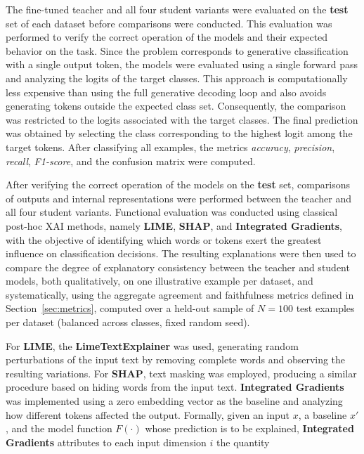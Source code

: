 \documentclass[conference]{IEEEtran}
\begin{document}
The fine-tuned teacher and all four student variants were evaluated on the \textbf{test} set of each dataset before comparisons were conducted. This evaluation was performed to verify the correct operation of the models and their expected behavior on the task. Since the problem corresponds to generative classification with a single output token, the models were evaluated using a single forward pass and analyzing the logits of the target classes. This approach is computationally less expensive than using the full generative decoding loop and also avoids generating tokens outside the expected class set. Consequently, the comparison was restricted to the logits associated with the target classes. The final prediction was obtained by selecting the class corresponding to the highest logit among the target tokens. After classifying all examples, the metrics \textit{accuracy}, \textit{precision}, \textit{recall}, \textit{F1-score}, and the confusion matrix were computed.

After verifying the correct operation of the models on the \textbf{test} set, comparisons of outputs and internal representations were performed between the teacher and all four student variants. Functional evaluation was conducted using classical post-hoc XAI methods, namely \textbf{LIME}, \textbf{SHAP}, and \textbf{Integrated Gradients}, with the objective of identifying which words or tokens exert the greatest influence on classification decisions. The resulting explanations were then used to compare the degree of explanatory consistency between the teacher and student models, both qualitatively, on one illustrative example per dataset, and systematically, using the aggregate agreement and faithfulness metrics defined in Section~\ref{sec:metrics}, computed over a held-out sample of $N=100$ test examples per dataset (balanced across classes, fixed random seed).

For \textbf{LIME}, the \textbf{LimeTextExplainer} was used, generating random perturbations of the input text by removing complete words and observing the resulting variations. For \textbf{SHAP}, text masking was employed, producing a similar procedure based on hiding words from the input text. \textbf{Integrated Gradients} was implemented using a zero embedding vector as the baseline and analyzing how different tokens affected the output. Formally, given an input $x$, a baseline $x'$, and the model function $F(\cdot)$ whose prediction is to be explained, \textbf{Integrated Gradients} attributes to each input dimension $i$ the quantity
\end{document}
